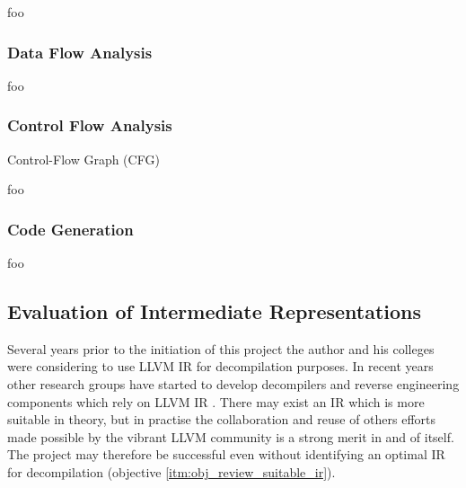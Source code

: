 foo


\subsubsection{Data Flow Analysis}

foo

\cite{type_decomp}


\subsubsection{Control Flow Analysis}

Control-Flow Graph (CFG)

foo


\subsubsection{Code Generation}

foo


\subsection{Evaluation of Intermediate Representations}




Several years prior to the initiation of this project the author and his colleges were considering to use LLVM IR for decompilation purposes. In recent years other research groups have started to develop decompilers and reverse engineering components which rely on LLVM IR \cite{decomp_llvm,retargetable_decomp,mcsema}. There may exist an IR which is more suitable in theory, but in practise the collaboration and reuse of others efforts made possible by the vibrant LLVM community is a strong merit in and of itself. The project may therefore be successful even without identifying an optimal IR for decompilation (objective \ref{itm:obj_review_suitable_ir}).

